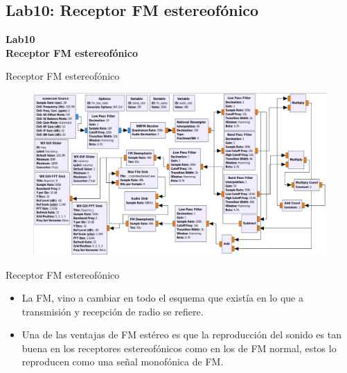 \subsection{Lab10: Receptor FM estereofónico}
\begin{frame}{}


\bfseries{\textrm{\LARGE Lab10\\ \Large Receptor FM estereofónico}}
\raggedright
\end{frame}

\begin{frame}{Receptor FM estereofónico}


\begin{figure}[H]
\centering
\vspace{-3mm}
\includegraphics[width=\textwidth]{parte3/lab9/pdf/lab9_1.pdf}
\end{figure}

\end{frame}

\begin{frame}{Receptor FM estereofónico}

\begin{itemize}
    \item {La FM, vino a cambiar en todo el esquema que existía en lo que a transmisión y recepción de radio se refiere.}
    \item {Una de las ventajas de FM estéreo es que la reproducción del sonido es tan buena en los receptores estereofónicos como en los de FM normal, estos lo reproducen como una señal monofónica de FM.}
\end{itemize}

\end{frame}

